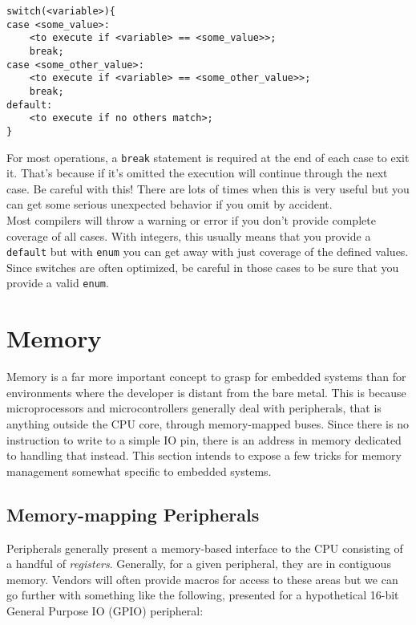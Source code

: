 \documentclass[10pt]{article}
\begin{document}
\begin{lstlisting}[label=lst-basic-switch,caption=Basic switch]
switch(<variable>){
case <some_value>:
	<to execute if <variable> == <some_value>>;
	break;
case <some_other_value>:
	<to execute if <variable> == <some_other_value>>;
	break;
default:
	<to execute if no others match>;
}
\end{lstlisting}

For most operations, a \texttt{break} statement is required at the end of each case to exit it. That's because if it's omitted the execution will continue through the next case. Be careful with this! There are lots of times when this is very useful but you can get some serious unexpected behavior if you omit by accident. \\

Most compilers will throw a warning or error if you don't provide complete coverage of all cases. With integers, this usually means that you provide a \texttt{default} but with \texttt{enum} you can get away with just coverage of the defined values. Since switches are often optimized, be careful in those cases to be sure that you provide a valid \texttt{enum}.



\section{Memory}
Memory is a far more important concept to grasp for embedded systems than for environments where the developer is distant from the bare metal. This is because microprocessors and microcontrollers generally deal with peripherals, that is anything outside the CPU core, through memory-mapped buses. Since there is no instruction to write to a simple IO pin, there is an address in memory dedicated to handling that instead. This section intends to expose a few tricks for memory management somewhat specific to embedded systems.

\subsection*{Memory-mapping Peripherals}
Peripherals generally present a memory-based interface to the CPU consisting of a handful of \emph{registers}. Generally, for a given peripheral, they are in contiguous memory. Vendors will often provide macros for access to these areas but we can go further with something like the following, presented for a hypothetical 16-bit General Purpose IO (GPIO) peripheral:
\end{document}
